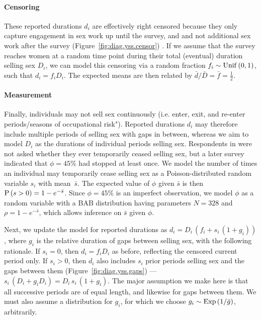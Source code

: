 \paragraph{Censoring}
These reported durations $d_i$ are effectively right censored
because they only capture engagement in sex work up until the survey, and
and not additional sex work after the survey
(Figure~\ref{fig:diag.yss.censor}) \cite{Fazito2012}.
If we assume that the survey reaches women at a random time point
during their total (eventual) duration selling sex $D_i$, we can model this censoring via
a random fraction $f_i \sim \mathrm{Unif}\,(0,1)$, such that $d_i = f_i D_i$.
The expected means are then related by $\bar{d} / \bar{D} = \bar{f} = \frac12$.
\paragraph{Measurement} %
Finally, individuals may not sell sex continuously (i.e. enter, exit, and re-enter periods/seasons of occupational risk"). %
Reported durations $d_i$ may therefore include
multiple periods of selling sex with gaps in between,
whereas we aim to model $D_i$ as the durations of individual periods selling sex.
Respondents in \cite{Baral2014} were not asked whether they ever temporarily ceased selling sex, %
but a later survey \cite{EswKP2014} indicated that $\phi = 45\%$ had stopped at least once. %
We model the number of times an individual may temporarily cease selling sex as
a Poisson-distributed random variable $s_i$ with mean~$\bar{s}$.
The expected value of $\phi$ given $\bar{s}$ is then $\mathrm{P}\,(s > 0) = 1 - e^{-\bar{s}}$.
Since $\phi = 45\%$ is an imperfect observation,
we model $\phi$ as a random variable with a BAB distribution
having parameters $N = 328$ and $\rho = 1 - e^{-\bar{s}}$,
which allows inference on $\bar{s}$ given $\phi$.
\par
Next, we update the model for reported durations as $d_i = D_i\,(f_i + s_i\,(1 + g_i))$,
where $g_i$ is the relative duration of gaps between selling sex,
with the following rationale.
If $s_i = 0$, then $d_i = f_i D_i$ as before, reflecting the censored current period only.
If $s_i > 0$, then $d_i$ also includes $s_i$ prior periods selling sex and the gaps between them
(Figure~\ref{fig:diag.yss.gaps}) --- \ie $s_i\,(D_i + g_i D_i) = D_i\,s_i\,(1 + g_i)$.
The major assumption we make here is that
all successive periods are of equal length, and likewise for gaps between them.
We must also assume a distribution for $g_i$, for which we choose
$g_i \sim \mathrm{Exp}\,(1/\bar{g})$, arbitrarily.
